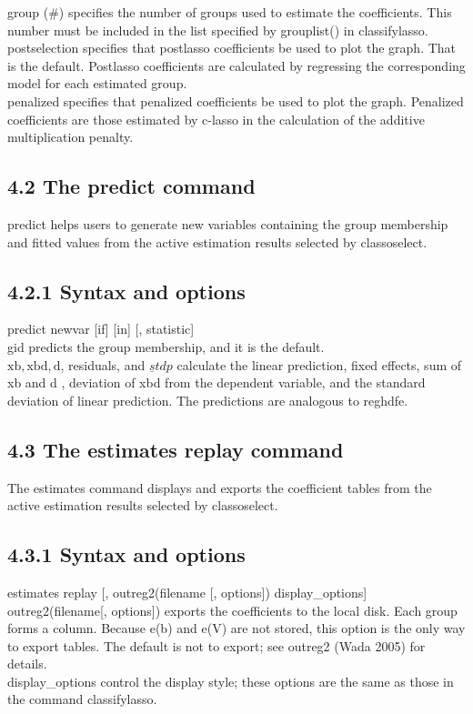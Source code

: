 \documentclass[10pt]{article}
\begin{document}
group (\#) specifies the number of groups used to estimate the coefficients. This number must be included in the list specified by grouplist() in classifylasso.\\
postselection specifies that postlasso coefficients be used to plot the graph. That is the default. Postlasso coefficients are calculated by regressing the corresponding model for each estimated group.\\
penalized specifies that penalized coefficients be used to plot the graph. Penalized coefficients are those estimated by c-lasso in the calculation of the additive multiplication penalty.

\subsection*{4.2 The predict command}
predict helps users to generate new variables containing the group membership and fitted values from the active estimation results selected by classoselect.

\subsection*{4.2.1 Syntax and options}
predict newvar [if] [in] [, statistic]\\
gid predicts the group membership, and it is the default.\\
$\mathrm{xb}, \mathrm{xbd}, \mathrm{d}$, residuals, and $\underline{s} t d p$ calculate the linear prediction, fixed effects, sum of xb and d , deviation of xbd from the dependent variable, and the standard deviation of linear prediction. The predictions are analogous to reghdfe.

\subsection*{4.3 The estimates replay command}
The estimates command displays and exports the coefficient tables from the active estimation results selected by classoselect.

\subsection*{4.3.1 Syntax and options}
estimates replay [, outreg2(filename [, options]) display\_options]\\[0pt]
outreg2(filename[, options]) exports the coefficients to the local disk. Each group forms a column. Because e(b) and e(V) are not stored, this option is the only way to export tables. The default is not to export; see outreg2 (Wada 2005) for details.\\
display\_options control the display style; these options are the same as those in the command classifylasso.
\end{document}
